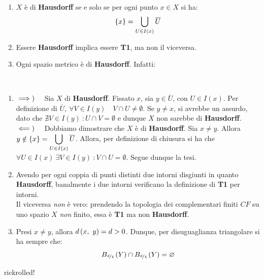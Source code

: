\begin{observe}~{}
	\begin{enumerate}
		\item $X$ è di \textbf{Hausdorff} se e solo se per ogni punto $x\in X$ si ha:
		\begin{equation}
			\left\{x\right\}=\inter_{U\in I\left(x\right)}\overline{U}
		\end{equation}
	\item Essere \textbf{Hausdorff} implica essere \textbf{T1}, ma non il viceversa.
		\item Ogni spazio metrico è di \textbf{Hausdorff}. Infatti:
	\end{enumerate}
\end{observe}
\begin{demonstration}~{}
\begin{enumerate}[label=\Roman*]
\item $\impliesdx$ Sia $X$ di \textbf{Hausdorff}. Fissato $x$, sia $y\in\overline{U}$, con $U\in I\left(x\right)$. Per definizione di $\overline{U},\ \forall V\in I\left(y\right)\quad V\cap U\neq\emptyset$. Se $y \neq x$, si avrebbe un assurdo, dato che $\nexists V\in I\left(y\right)\ \colon U\cap V=\emptyset$ e dunque $X$ non sarebbe di \textbf{Hausdorff}.\\
$\impliessx$ Dobbiamo dimostrare che $X$ è di \textbf{Hausdorff}. Sia $x\neq y$. Allora $\displaystyle y\notin\left\{x\right\}=\inter_{U\in I\left(x\right)}\overline{U}$. Allora, per definizione di chiusura si ha che $\forall U\in I\left(x\right)\ \exists V\in I\left(y\right)\ \colon V\cap U=\emptyset$. Segue dunque la tesi.
\item Avendo per ogni coppia di punti distinti due intorni disgiunti in quanto \textbf{Hausdorff}, banalmente i due intorni verificano la definizione di \textbf{T1} per intorni.\\
Il viceversa \textit{non} è vero: prendendo la topologia dei complementari finiti $CF$ su uno spazio $X$ \textit{non} finito, essa è \textbf{T1} ma non \textbf{Hausdorff}.
\item Presi $x\neq y$, allora $\mvf{d}{x}{y}=d>0$. Dunque, per disuguaglianza triangolare si ha sempre che:
\begin{equation*}
B_{\nicefrac{d}{4}}\left(Y\right)\cap B_{\nicefrac{d}{4}}\left(Y\right)=\emptyset
\end{equation*}
\end{enumerate}
\end{demonstration}

rickrolled!